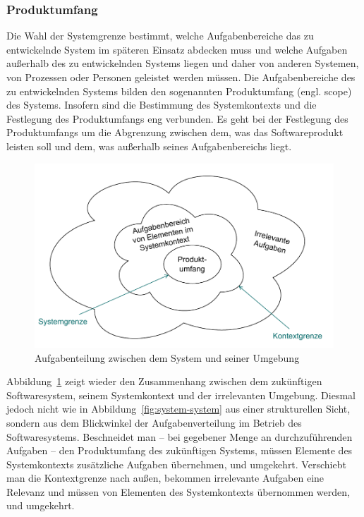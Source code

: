 \subsubsection{Produktumfang}
\label{sec:Kap-6.1.3.2}

Die Wahl der Systemgrenze bestimmt, welche Aufgabenbereiche das zu entwickelnde System im späteren Einsatz abdecken muss und welche Aufgaben außerhalb des zu entwickelnden Systems liegen und daher von anderen Systemen, von Prozessen oder Personen geleistet werden müssen. Die Aufgabenbereiche des zu entwickelnden Systems bilden den sogenannten Produktumfang (engl. scope) des Systems. Insofern sind die Bestimmung des Systemkontexts und die Festlegung des Produktumfangs eng verbunden. Es geht bei der Festlegung des Produktumfangs um die Abgrenzung zwischen dem, was das Softwareprodukt leisten soll und dem, was außerhalb seines Aufgabenbereichs liegt.

\begin{figure}[h!]
	\centering
	\vspace{2mm} %
	\vspace{\baselineskip} %
	\includegraphics[scale=0.75]{Bilder/Kapitel-6/system-produktumfang.pdf}
	\caption{Aufgabenteilung zwischen dem System und seiner Umgebung}
	\label{fig:system-produktumfang}
	\vspace{\baselineskip} %
\end{figure}

Abbildung~\ref{fig:system-produktumfang} zeigt wieder den Zusammenhang zwischen dem zukünftigen Softwaresystem, seinem Systemkontext und der irrelevanten Umgebung. Diesmal jedoch nicht wie in Abbildung~\ref{fig:system-system} aus einer strukturellen Sicht, sondern aus dem Blickwinkel der Aufgabenverteilung im Betrieb des Softwaresystems. Beschneidet man -- bei gegebener Menge an durchzuführenden Aufgaben -- den Produktumfang des zukünftigen Systems, müssen Elemente des Systemkontexts zusätzliche Aufgaben übernehmen, und umgekehrt. Verschiebt man die Kontextgrenze nach außen, bekommen irrelevante Aufgaben eine Relevanz und müssen von Elementen des Systemkontexts übernommen werden, und umgekehrt.

